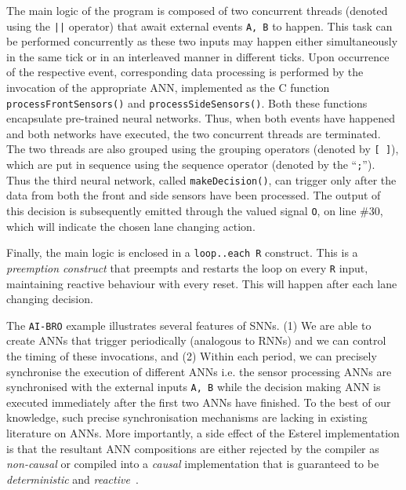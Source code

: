 The main logic of the program is composed of two concurrent threads (denoted using the \texttt{||} operator)
that await external events \texttt{A, B} to happen. 
This task can be performed concurrently as these two inputs may happen either simultaneously in the same tick or 
in an interleaved manner in different ticks. Upon occurrence of the respective event, corresponding data processing 
is performed by the invocation of the appropriate \ac{ANN}, implemented as the C function \texttt{processFrontSensors()}
and \texttt{processSideSensors()}. Both these functions encapsulate pre-trained neural networks. Thus, when both events have 
happened and both networks have executed, the two concurrent threads are terminated. The two threads are also grouped using the 
grouping operators (denoted by \texttt{[ ]}), which are put in sequence using the sequence operator (denoted by the ``\texttt;''). %
Thus the third neural network, called \texttt{makeDecision()},
can trigger only after the data from both the front and side sensors have been processed. 
The output of this decision is subsequently emitted through the valued signal \texttt{O}, on line \#30, which will indicate the chosen lane changing action.

Finally, the main logic is enclosed in a \texttt{loop..each R} construct. This is a \emph{preemption construct} that preempts and restarts the 
loop on every \texttt{R} input, maintaining reactive behaviour with every reset.
This will happen after each lane changing decision.


The \texttt{AI-BRO} example illustrates several features of \acp{SNN}. (1) We are able to create \acp{ANN} that trigger periodically (analogous
to \acp{RNN}) and we can control the timing of these invocations, and (2) Within each period, we can precisely synchronise the 
execution of different \acp{ANN} i.e. the sensor processing \acp{ANN} are synchronised with the external inputs 
\texttt{A, B} while the decision making \ac{ANN} is executed immediately after the first two \acp{ANN} have finished. 
To the best of our knowledge, such precise synchronisation mechanisms are lacking in existing literature on \acp{ANN}.
More importantly, a side effect of the Esterel implementation is that the resultant \ac{ANN} compositions are 
either rejected by the compiler as \emph{non-causal} or compiled into a \emph{causal} implementation that is guaranteed to be
\emph{deterministic} and \emph{reactive}~\cite{benveniste2003synchronous}.

